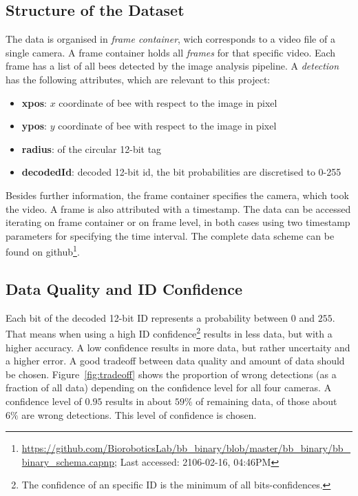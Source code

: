 \subsection{Structure of the Dataset}
The data is organised in \emph{frame container}, wich corresponds to a video file of a single camera. A frame container holds all \emph{frames} for that specific video.
Each frame has a list of all bees detected by the image analysis pipeline.
A \emph{detection} has the following attributes, which are relevant to this project:

\begin{itemize}
\item \textbf{xpos}: $x$ coordinate of bee with respect to the image in pixel
\item \textbf{ypos}: $y$ coordinate of bee with respect to the image in pixel
\item \textbf{radius}: of the circular 12-bit tag
\item \textbf{decodedId}: decoded 12-bit id, the bit probabilities are discretised to 0-255
\end{itemize}

Besides further information, the frame container specifies the camera, which took the video. A frame is also attributed with a timestamp. The data can be accessed iterating on frame container or on frame level, in both cases using two timestamp parameters for specifying the time interval. The complete data scheme can be found on github\footnote{\url{https://github.com/BioroboticsLab/bb_binary/blob/master/bb_binary/bb_binary_schema.capnp}; Last accessed: 2106-02-16, 04:46PM}. 


\subsection{Data Quality and ID Confidence}
\label{subsec:confidence}

Each bit of the decoded 12-bit ID represents a probability between $0$ and $255$. That means when using a high ID confidence\footnote{The confidence of an specific ID is the minimum of all bits-confidences.} results in less data, but with a higher accuracy.
A low confidence results in more data, but rather uncertaity and a higher error. A good tradeoff between data quality and amount of data should be chosen. Figure~\ref{fig:tradeoff} shows the proportion of wrong detections (as a fraction of all data) depending on the confidence level for all four cameras.
A confidence level of $0.95$ results in about $59\%$ of remaining data, of those about $6\%$ are wrong detections. This level of confidence is chosen.

